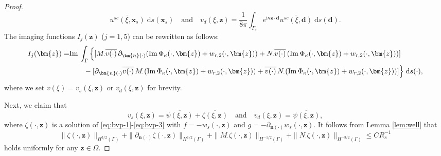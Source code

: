 \documentclass[10pt,a4paper]{article}
\numberwithin{equation}{section}
\begin{document}
\begin{proof}
\begin{equation}
    \overline{u^{sc}(\xi ,\bm{ x }_s)} \;\mathrm{d}s(\bm{ x }_s)
    \quad \text{and} \quad
    v_{d}(\xi , \bm{ z })  =  \frac{1}{8\pi} \int_{ \Gamma_{s} } e^{\mathrm{ i } \kappa \bm{ z }\cdot \bm{ d }}
    \overline{u^{sc}(\xi ,\bm{ d })} \;\mathrm{d}s(\bm{ d }).
  \end{equation}
  The imaging functions $I_j (\bm{ z })$ ($j=1,5$) can be rewritten as follows:
  \begin{align}
    \notag
    I_j(\bm{ z }) 
    = &\mathrm{Im}\, \int_{ \Gamma } \Big\{ [M_{\cdot }\overline{v(\cdot )}\, \partial_{\bm{n}(\cdot  )}
        (\mathrm{Im}\, \Phi_{\kappa}(\cdot ,\bm{z}) + w_{r,2}(\cdot,\bm{z}) )
        +N_{\cdot  } \overline{v(\cdot)}\,
        (\mathrm{Im}\, \Phi_{\kappa}(\cdot ,\bm{z}) + w_{r,2}(\cdot ,\bm{z}) ) ]  \\
    \label{eq:imaging}
   & \qquad - [ \partial_{\bm{n}(\cdot  )}\overline{v(\cdot )}\,  M_{\cdot  }
     ( \mathrm{Im}\, \Phi_{\kappa}(\cdot ,\bm{z}) + w_{r,2}(\cdot ,\bm{z})  )
     + \overline{v(\cdot )} \, N_{\cdot }
     ( \mathrm{Im}\, \Phi_{\kappa}(\cdot ,\bm{z}) + w_{r,2}(\cdot ,\bm{z}) )
     ]  \Big\} \;\mathrm{d}s(\cdot ),
  \end{align}
  where we set $v(\xi)=v_{s}(\xi , \bm{ z })$ or $ v_{d}(\xi , \bm{ z })$ for brevity.
  
  Next, we claim that
  \begin{equation}
    \label{eq:decomposition}
    v_s(\xi , \bm{ z })=\overline{\psi(\xi ,\bm{ z })} +\overline{ \zeta(\xi ,\bm{ z })}
    \quad \text{and} \quad
    v_d(\xi , \bm{ z })=\overline{\psi(\xi ,\bm{ z })},
  \end{equation}
  where $\zeta(\cdot ,\bm{ z })$ is a  solution of \eqref{eq:bvp-1}-\eqref{eq:bvp-3} with $f=-w_s(\cdot ,\bm{ z })$ and $g=-\partial_{\bm{n}(\cdot )}w_s(\cdot ,\bm{ z }) $. It follows from Lemma \ref{lem:well} that
  \begin{equation}    \label{eq:zeta}
    \|\zeta(\cdot ,\bm{ z } )\|_{H^{3/2}(\Gamma)} + \|\partial_{\bm{n}(\cdot )} \zeta(\cdot ,\bm{ z } )\|_{H^{1/2}(\Gamma)}   
       +\|M_{\cdot} \zeta(\cdot ,\bm{ z })\|_{H^{-1/2}(\Gamma)} + \|N_{\cdot} \zeta(\cdot ,\bm{ z }) \|_{H^{-3/2}(\Gamma)}
        \le C R_s^{-1}
  \end{equation}
  holds  uniformly for any $\bm{ z }\in \Omega$.
  

\end{proof}
\end{document}
